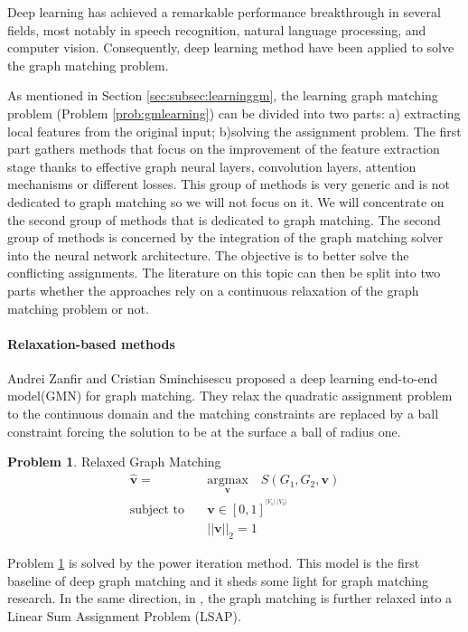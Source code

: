 \documentclass[times,onecolumn,final,authoryear]{article}
\theoremstyle{definition}
\newtheorem{problem}{Problem}
\begin{document}
Deep learning has achieved a remarkable performance breakthrough in several fields, most notably in speech recognition, natural language processing, and computer vision. Consequently, deep learning method have been applied to solve the graph matching problem. 

As mentioned in Section \ref{sec:subsec:learninggm}, the learning graph matching problem (Problem \ref{prob:gmlearning}) can be divided into two parts: a) extracting local features from the original input; b)solving the assignment problem. 
The first part gathers methods that focus on the improvement of the feature extraction stage thanks to effective graph neural layers, convolution layers, attention mechanisms or different losses. This group of methods is very generic and is not dedicated to graph matching so we will not focus on it. We will concentrate on the second group of methods that is dedicated to graph matching. The second group of methods is concerned by the integration of the graph matching solver into the neural network architecture. The objective is to better solve the conflicting assignments. The literature on this topic can then be split into two parts whether the approaches rely on a continuous relaxation of the graph matching problem or not.

\paragraph{Relaxation-based methods}
Andrei Zanfir and Cristian Sminchisescu \cite{GMN} proposed a deep learning end-to-end model(GMN) for graph matching. They relax the quadratic assignment problem to the continuous domain and the matching constraints are replaced by a ball constraint forcing the solution to be at the surface a ball of radius one.
\begin{problem}{Relaxed Graph Matching}
\label{prob:relaxgm}
\begin{subequations}
  \begin{align}
   \hat{\textbf{v}} =& \underset{\textbf{v}} {\mathrm{argmax}} \quad S(G_1, G_2, \textbf{v})\\
    \text{subject to}\quad & \textbf{v} \in [0, 1]^{^{|V_1| . |V_2|}}\\
    &|| \textbf{v} ||_2=1
  \end{align}
\end{subequations}
\end{problem}
Problem \ref{prob:relaxgm} is solved by the power iteration method. This model is the first baseline of deep graph matching and it sheds some light for graph matching research. In the same direction, in \cite{SinkhornNet,PCA-GM}, the graph matching is further relaxed into a Linear Sum Assignment Problem (LSAP).
\end{document}
